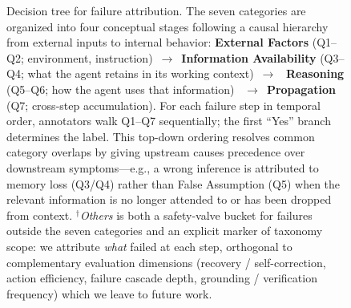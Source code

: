 \documentclass[11pt]{article}
\begin{document}
\begin{figure}[t]
\caption{Decision tree for failure attribution. The seven categories are
organized into four conceptual stages following a causal hierarchy from
external inputs to internal behavior: \textbf{External Factors} (Q1--Q2;
environment, instruction)~$\rightarrow$~\textbf{Information Availability}
(Q3--Q4; what the agent retains in its working context)~$\rightarrow$~%
\textbf{Reasoning} (Q5--Q6; how the agent uses that information)~%
$\rightarrow$~\textbf{Propagation} (Q7; cross-step accumulation).
For each failure step in temporal order, annotators walk Q1--Q7 sequentially;
the first ``Yes'' branch determines the label. This top-down ordering
resolves common category overlaps by giving upstream causes precedence over
downstream symptoms---e.g., a wrong inference is attributed to memory loss
(Q3/Q4) rather than False Assumption (Q5) when the relevant information is no
longer attended to or has been dropped from context. $^{\dagger}$\emph{Others}
is both a safety-valve bucket for failures outside the seven categories and
an explicit marker of taxonomy scope: we attribute \emph{what} failed at each
step, orthogonal to complementary evaluation dimensions
(recovery / self-correction, action efficiency, failure cascade depth,
grounding / verification frequency) which we leave to future work.}
\label{fig:decision_tree}
\end{figure}
\end{document}
